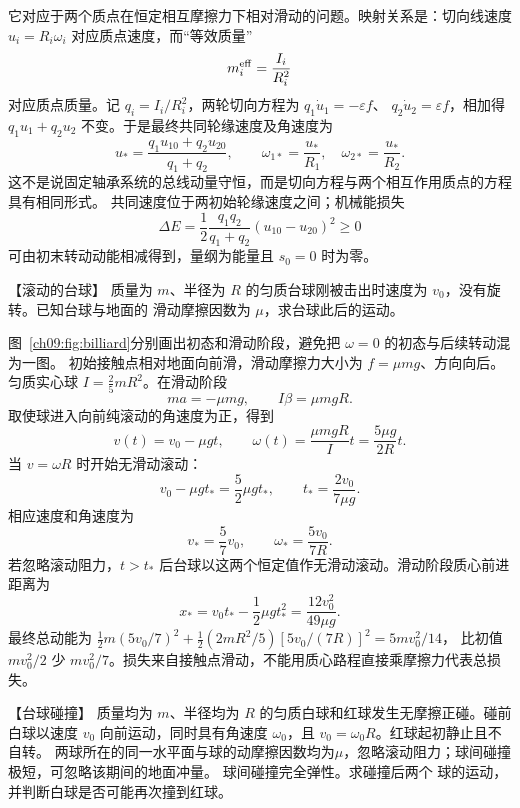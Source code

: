 {\begin{xesolution}
它对应于两个质点在恒定相互摩擦力下相对滑动的问题。映射关系是：切向线速度
$u_i=R_i\omega_i$ 对应质点速度，而“等效质量”
\[
 m_i^{\rm eff}=\frac{I_i}{R_i^2}
\]
对应质点质量。记 $q_i=I_i/R_i^2$，两轮切向方程为 $q_1\dot u_1=-\varepsilon f$、
$q_2\dot u_2=\varepsilon f$，相加得 $q_1u_1+q_2u_2$ 不变。于是最终共同轮缘速度及角速度为
\[
 u_* =\frac{q_1u_{10}+q_2u_{20}}{q_1+q_2},\qquad
 \omega_{1*}=\frac{u_*}{R_1},\quad \omega_{2*}=\frac{u_*}{R_2}.
\]
这不是说固定轴承系统的总线动量守恒，而是切向方程与两个相互作用质点的方程具有相同形式。
共同速度位于两初始轮缘速度之间；机械能损失
\[
 \Delta E=\frac12\frac{q_1q_2}{q_1+q_2}(u_{10}-u_{20})^2\ge0
\]
可由初末转动动能相减得到，量纲为能量且 $s_0=0$ 时为零。
\end{xesolution}

\begin{origexamplebox}{【滚动的台球】}\label{ch09:ex:s17-15-3}
质量为 $m$、半径为 $R$ 的匀质台球刚被击出时速度为 $v_0$，没有旋转。已知台球与地面的
滑动摩擦因数为 $\mu$，求台球此后的运动。


\ThQBilliard
\end{origexamplebox}

\begin{xesolution}
\billiardRollingDiagram

图~\ref{ch09:fig:billiard}分别画出初态和滑动阶段，避免把 $\omega=0$ 的初态与后续转动混为一图。
初始接触点相对地面向前滑，滑动摩擦力大小为 $f=\mu mg$、方向向后。匀质实心球
$I=\tfrac25mR^2$。在滑动阶段
\[
 ma=-\mu mg,
 \qquad I\beta=\mu mgR.
\]
取使球进入向前纯滚动的角速度为正，得到
\[
 v(t)=v_0-\mu gt,
 \qquad
 \omega(t)=\frac{\mu mgR}{I}t=\frac{5\mu g}{2R}t.
\]
当 $v=\omega R$ 时开始无滑动滚动：
\[
 v_0-\mu gt_* =\frac52\mu gt_*,
 \qquad
 \boxed{t_* =\frac{2v_0}{7\mu g}}.
\]
相应速度和角速度为
\[
 \boxed{v_* =\frac57v_0},
 \qquad
 \boxed{\omega_* =\frac{5v_0}{7R}}.
\]
若忽略滚动阻力，$t>t_*$ 后台球以这两个恒定值作无滑动滚动。滑动阶段质心前进距离为
\[
 \boxed{x_* =v_0t_* -\frac12\mu gt_*^2
 =\frac{12v_0^2}{49\mu g}}.
\]
最终总动能为 $\tfrac12m(5v_0/7)^2+\tfrac12(2mR^2/5)[5v_0/(7R)]^2=5mv_0^2/14$，
比初值 $mv_0^2/2$ 少 $mv_0^2/7$。损失来自接触点滑动，不能用质心路程直接乘摩擦力代表总损失。
\end{xesolution}

\begin{origexamplebox}{【台球碰撞】}\label{ch09:ex:s17-15-4}
质量均为 $m$、半径均为 $R$ 的匀质白球和红球发生无摩擦正碰。碰前白球以速度 $v_0$
向前运动，同时具有角速度 $\omega_0$，且 $v_0=\omega_0R$。红球起初静止且不自转。
两球所在的同一水平面与球的动摩擦因数均为$\mu$，忽略滚动阻力；球间碰撞极短，可忽略该期间的地面冲量。
球间碰撞完全弹性。求碰撞后两个
球的运动，并判断白球是否可能再次撞到红球。



\end{origexamplebox}}
